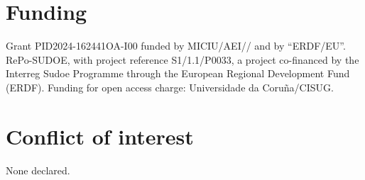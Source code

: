 \section{Funding}

Grant PID2024-162441OA-I00 funded by
MICIU/AEI// and by
``ERDF/EU''. RePo-SUDOE, with project reference S1/1.1/P0033, a project
co-financed by the Interreg Sudoe Programme through the European Regional
Development Fund (ERDF). Funding for open access charge: Universidade da
Coru\~na/CISUG.

\section{Conflict of interest}

None declared.
